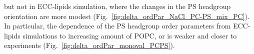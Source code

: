 \documentclass[journal=jpcbfk,manuscript=article]{achemso}
\begin{document}
but not in ECC-lipids simulation, 
where the changes in the PS headgroup orientation are more modest (Fig.~\ref{fig:delta_ordPar_NaCl_PC-PS_mix_PC}).
In particular, 
the dependence of the PS headgroup order parameters from ECC-lipids simulations
to increasing amount of POPC,  or 
is weaker and closer to experiments 
(Fig.~\ref{fig:delta_ordPar_monoval_PCPS}).
\end{document}
